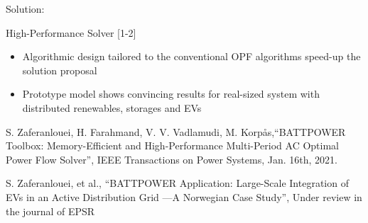 \documentclass{beamer}
\begin{document}
\begin{frame}{Solution:}
\begin{block}{High-Performance Solver [1-2]}
\begin{itemize}
\item<1-> Algorithmic design tailored to the conventional OPF algorithms speed-up the solution proposal
\item<1-> Prototype model shows convincing results for real-sized system with distributed renewables, storages and EVs

\end{itemize}
\end{block}

\begin{enumerate}
{\tiny
\item S. Zaferanlouei, H. Farahmand, V. V. Vadlamudi, M. Korpås,“BATTPOWER Toolbox: Memory-Efficient and High-Performance Multi-Period AC Optimal Power Flow Solver”, IEEE Transactions on Power Systems, Jan. 16th, 2021.
\item S. Zaferanlouei, et al., “BATTPOWER Application: Large-Scale Integration of EVs in an Active Distribution Grid ---A Norwegian Case Study”, Under review in the journal of EPSR}
 \end{enumerate}
\end{frame}
\end{document}
